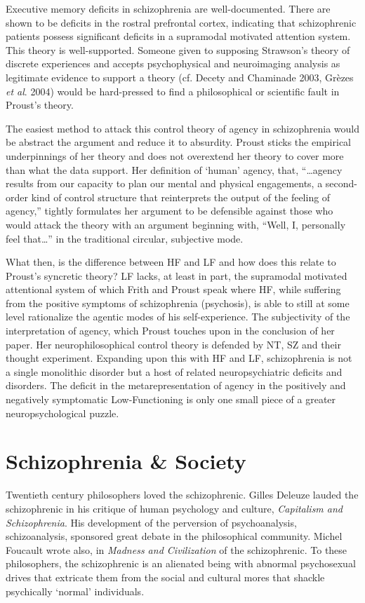\documentclass[]{article}
\begin{document}
		Executive memory deficits in schizophrenia are well-documented. There are shown to be deficits in the rostral prefrontal cortex, indicating that schizophrenic patients possess significant deficits in a supramodal motivated attention system. This theory is well-supported. Someone given to supposing Strawson’s theory of discrete experiences and accepts psychophysical and neuroimaging analysis as legitimate evidence to support a theory (cf. Decety and Chaminade 2003, Grèzes \textit{et al}. 2004) would be hard-pressed to find a philosophical or scientific fault in Proust’s theory.
		
		The easiest method to attack this control theory of agency in schizophrenia would be abstract the argument and reduce it to absurdity. Proust sticks the empirical underpinnings of her theory and does not overextend her theory to cover more than what the data support. Her definition of ‘human’ agency, that, “…agency results from our capacity to plan our mental and physical engagements, a second-order kind of control structure that reinterprets the output of the feeling of agency,” tightly formulates her argument to be defensible against those who would attack the theory with an argument beginning with, “Well, I, personally feel that…” in the traditional circular, subjective mode.
		
		What then, is the difference between HF and LF and how does this relate to Proust’s syncretic theory? LF lacks, at least in part, the supramodal motivated attentional system of which Frith and Proust speak where HF, while suffering from the positive symptoms of schizophrenia (psychosis), is able to still at some level rationalize the agentic modes of his self-experience. The subjectivity of the interpretation of agency, which Proust touches upon in the conclusion of her paper. Her neurophilosophical control theory is defended by NT, SZ and their thought experiment. Expanding upon this with HF and LF, schizophrenia is not a single monolithic disorder but a host of related neuropsychiatric deficits and disorders. The deficit in the metarepresentation of agency in the positively and negatively symptomatic Low-Functioning is only one small piece of a greater neuropsychological puzzle.
		
\section{Schizophrenia \& Society}

	Twentieth century philosophers loved the schizophrenic. Gilles Deleuze lauded the schizophrenic in his critique of human psychology and culture, \textit{Capitalism and Schizophrenia}. His development of the perversion of psychoanalysis, schizoanalysis, sponsored great debate in the philosophical community. Michel Foucault wrote also, in \textit{Madness and Civilization} of the schizophrenic. To these philosophers, the schizophrenic is an alienated being with abnormal psychosexual drives that extricate them from the social and cultural mores that shackle psychically ‘normal’ individuals.
	
\end{document}
